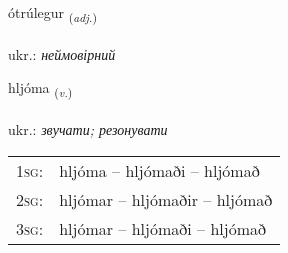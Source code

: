 \documentclass[frontgrid, backgrid]{flacards}\usepackage[]{graphicx}\usepackage[]{xcolor}
\begin{document}
{ótrúlegur \small{\textsubscript{(\textit{adj.})}} \\[1ex] %
\textphonetic{[ouːtʰrulɛɣʏr]} \\
ukr.: \emph{неймовірний} \\  [2ex]
\renewcommand*{\arraystretch}{0.8}
}

\renewcommand{\flhead}{\vskip5pt \fboxsep=0pt {\small\bfseries\footnotesize Sagnorð | дієслово}}
\renewcommand{\fcfoot}{\vskip5pt \fboxsep=0pt \hspace{2pt}{\small\bfseries\footnotesize 2K}}

\renewcommand{\blhead}{\vskip5pt {\small\bfseries\footnotesize Sagnorð | дієслово }}
\renewcommand{\bcfoot}{\vskip5pt \hspace{2pt}{\small\bfseries\footnotesize 2K}}


{hljóma \small{\textsubscript{(\textit{v.})}} \\[1ex] %
\textphonetic{[l̥jouːma]} \\
ukr.: \emph{звучати; резонувати} \\  [2ex]
\renewcommand*{\arraystretch}{0.8}
\begin{tabular}{p{1cm}l}
\textsc{1sg}: & hljóma -- hljómaði -- hljómað \\ 
\textsc{2sg}: & hljómar -- hljómaðir -- hljómað \\ 
\textsc{3sg}: & hljómar -- hljómaði -- hljómað \\ 
\end{tabular}
}

\renewcommand{\flhead}{\vskip5pt \fboxsep=0pt {\small\bfseries\footnotesize Lýsingarorð | прикметник}}
\renewcommand{\fcfoot}{\vskip5pt \fboxsep=0pt \hspace{2pt}{\small\bfseries\footnotesize 2K}}
\end{document}
